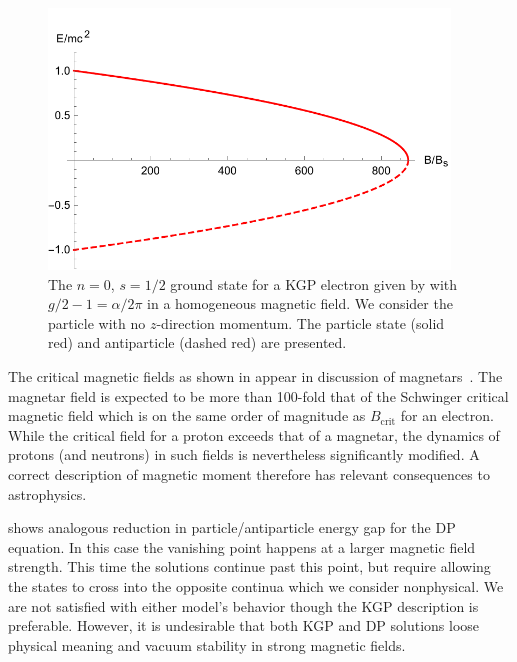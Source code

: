 \begin{figure}[ht]
     \centering
     \includegraphics[clip, trim=0.0cm 0.0cm 0.0cm 0.5cm,width=0.95\textwidth]{plots/chap02moment/lanplot01.pdf}
     \caption{The $n=0$, $s=1/2$ ground state for a KGP electron given by  with $g/2-1=\alpha/2\pi$ in a homogeneous magnetic field. We consider the particle with no $z$-direction momentum. The particle state (solid red) and antiparticle (dashed red) are presented.}
     \label{f01}
\end{figure}

The critical magnetic fields as shown in  appear in discussion of magnetars~\citep{Kaspi:2017fwg}. The magnetar field is expected to be more than 100-fold that of the Schwinger critical magnetic field which is on the same order of magnitude as $B_\textrm{crit}$ for an electron. While the critical field for a proton exceeds that of a magnetar, the dynamics of protons (and neutrons) in such fields is nevertheless significantly modified. A correct description of magnetic moment therefore has relevant consequences to astrophysics. 

 shows analogous reduction in particle/anti\-particle energy gap for the DP equation. In this case the vanishing point happens at a larger magnetic field strength. This time the solutions continue past this point, but require allowing the states to cross into the opposite continua which we consider nonphysical. We are not satisfied with either model's behavior though the KGP description is preferable. However, it is undesirable that both KGP and DP solutions loose physical meaning and vacuum stability in strong magnetic fields.

